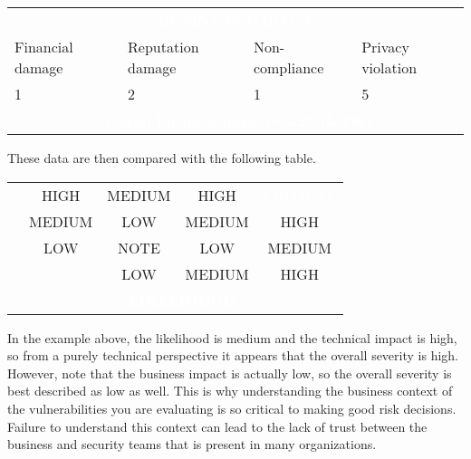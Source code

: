 \noindent
\begin{table}[H]
\centering
\begin{tabularx}{\textwidth}{|X|X|X|X|}
    \hline
    \multicolumn{4}{|c|}{{\cellcolor{dummy-cyan}}\textbf{\textcolor{white}{BUSINESS IMPACT}}}\\
    Financial damage & Reputation damage & Non-compliance & Privacy violation\\
    \hline
    1 & 2 & 1 & 5\\
    \hline
    \multicolumn{4}{c|}{{\cellcolor{dummy-cyan}}\textbf{\textcolor{white}{Overall business impact=2.25 (LOW)}}}\\
    \hline
\end{tabularx}
\end{table}
\noindent
These data are then compared with the following table.
\begin{table}[H]
\centering
\begin{tabularx}{\textwidth}{|>{\centering\arraybackslash}X|c|c|c|c|}
    \hline
    \multicolumn{5}{|c|}{{\cellcolor{dummy-cyan}}\textbf{\textcolor{white}{OVERALL RISK SEVERITY}}}\\
    \hline
    {\cellcolor{dummy-cyan}} & HIGH & {\cellcolor{dummy-orange}MEDIUM} & {\cellcolor{dummy-red}HIGH} & {\cellcolor{dummy-red-strong}\textcolor{white}{CRITICAL}}\\
    \cline{2-5}
    {\cellcolor{dummy-cyan}} & MEDIUM & {\cellcolor{dummy-yellow}LOW} & {\cellcolor{dummy-orange}MEDIUM} & {\cellcolor{dummy-red}HIGH}\\
    \cline{2-5}
    {\cellcolor{dummy-cyan}} & LOW & {\cellcolor{dummy-green}NOTE} & {\cellcolor{dummy-yellow}LOW} & {\cellcolor{dummy-orange}MEDIUM} \\
    \cline{2-5}
     \multirow{-4}{*}{{\cellcolor{dummy-cyan}}\textbf{\textcolor{white}{IMPACT}}} & & LOW & MEDIUM & HIGH\\
    \hline
    & \multicolumn{4}{|c|}{{\cellcolor{dummy-cyan}}\textbf{\textcolor{white}{LIKELIHOOD}}}\\
    \hline
\end{tabularx}
\end{table}
\noindent
In the example above, the likelihood is medium and the technical impact is high, so from a purely technical perspective it appears that the overall severity is high. However, note that the business impact is actually low, so the overall severity is best described as low as well. This is why understanding the business context of the vulnerabilities you are evaluating is so critical to making good risk decisions. Failure to understand this context can lead to the lack of trust between the business and security teams that is present in many organizations.
